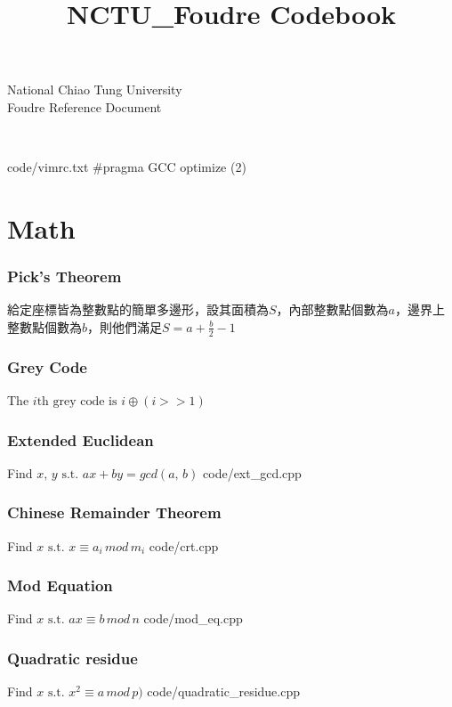 \documentclass [landscape,8pt,a4paper,twocolumn]{article}
\title {NCTU\_Foudre Codebook}
\begin{document}
\thispagestyle{fancy}
{ \Huge National Chiao Tung University \\ Foudre Reference Document}
\tableofcontents

~\newline
~\newline
~\newline

 {code/vimrc.txt}
\#pragma GCC optimize (2)

\newpage
\part{Math}

\section{Pick's Theorem}
給定座標皆為整數點的簡單多邊形，設其面積為$ S $，內部整數點個數為$ a $，邊界上整數點個數為$ b $，則他們滿足$ S=a+\frac{b}{2}-1 $

\section{Grey Code}
The $ i \text{th grey code is } i \oplus (i>>1) $

\section{Extended Euclidean}
Find $ x, \, y \text{ s.t. } ax+by=gcd(a, \, b) $
 {code/ext_gcd.cpp}

\section{Chinese Remainder Theorem}
Find $ x \text{ s.t. } x \equiv a_i \, mod \, m_i $
 {code/crt.cpp}

\section{Mod Equation}
Find $ x \text{ s.t. } ax \equiv b \, mod \, n $
 {code/mod_eq.cpp}

\section{Quadratic residue}
Find $ x \text{ s.t. } x^2 \equiv a \, mod \, p) $
{code/quadratic_residue.cpp}
\end{document}
